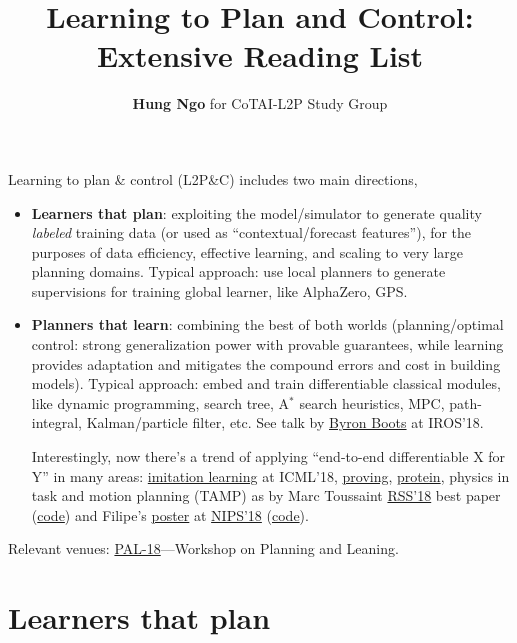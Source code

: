 \documentclass[12pt]{article}
\title{Learning to Plan and Control: Extensive Reading List}
\author{{\bf Hung Ngo} for CoTAI-L2P Study Group}
\numberwithin{equation}{section}
\begin{document}
\maketitle

Learning to plan \& control (L2P\&C) includes two main directions,
\begin{itemize} 

\item {\bf Learners that plan}: exploiting the model/simulator to generate quality {\em labeled} training data (or used as ``contextual/forecast features''), for the purposes of data efficiency, effective learning, and scaling to very large planning domains. Typical approach: use local planners to generate {\color{red}supervisions} for training global learner, like AlphaZero, GPS. 

\item {\bf Planners that learn}: combining the best of both worlds (planning/optimal control: strong generalization power with provable guarantees, while learning provides adaptation and mitigates the compound errors and cost in building models). Typical approach: embed and train {\color{red}differentiable classical modules}, like dynamic programming, search tree, A$^*$ search heuristics, MPC, path-integral, Kalman/particle filter, etc. See talk by \href{https://personalrobotics.cs.washington.edu/workshops/mlmp2018/assets/ppts/boots_iros_mlmp_2018.pdf}{Byron Boots} at IROS'18. 

Interestingly, now there's a trend of applying ``{\color{red}end-to-end differentiable X for Y}'' in many areas: \href{http://proceedings.mlr.press/v70/baram17a.html}{imitation learning} at ICML'18, \href{https://github.com/uclmr/ntp}{proving}, \href{https://www.biorxiv.org/content/early/2018/08/29/265231}{protein}, physics in task and motion planning (TAMP) as by Marc Toussaint \href{http://www.roboticsproceedings.org/rss14/p44.pdf}{RSS'18}  best paper (\href{https://github.com/MarcToussaint/18-RSS-PhysicalManipulation}{code}) and Filipe's \href{https://filipeabperes.github.io/files/2018/nips_poster.pdf}{poster} at \href{https://papers.nips.cc/paper/7948-end-to-end-differentiable-physics-for-learning-and-control}{NIPS'18}  (\href{https://github.com/locuslab/lcp-physics}{code}).

\end{itemize}

Relevant venues: \href{https://sites.google.com/site/planlearn18/}{PAL-18}---Workshop on Planning and Leaning. 

\section{Learners that plan}
\end{document}

